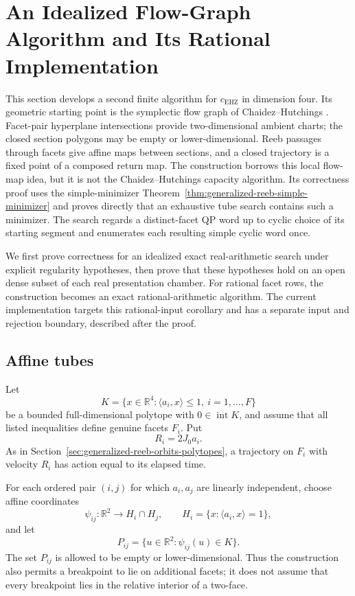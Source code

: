 \section{An Idealized Flow-Graph Algorithm and Its Rational Implementation}
\label{sec:flow-graph-algorithm-ch2021}

This section develops a second finite algorithm for
\(c_{\mathrm{EHZ}}\) in dimension four.  Its geometric starting point is the
symplectic flow graph of Chaidez--Hutchings \cite{CH2021}.  Facet-pair
hyperplane intersections provide two-dimensional ambient charts; the closed
section polygons may be empty or lower-dimensional.  Reeb passages through
facets give affine maps between sections, and a closed trajectory is a fixed
point of a composed return map.  The construction borrows this local flow-map
idea, but it is not the Chaidez--Hutchings capacity algorithm.  Its correctness
proof uses the simple-minimizer
Theorem~\ref{thm:generalized-reeb-simple-minimizer} and proves directly that an
exhaustive tube search contains such a minimizer.
The search regards a distinct-facet QP word up to cyclic choice of its starting
segment and enumerates each resulting simple cyclic word once.

We first prove correctness for an idealized exact real-arithmetic search under
explicit regularity hypotheses, then prove that these hypotheses hold on an
open dense subset of each real presentation chamber.  For rational facet rows,
the construction becomes an exact rational-arithmetic algorithm.  The current
implementation targets this rational-input corollary and has a separate input
and rejection boundary, described after the proof.

\subsection{Affine tubes}
\label{subsec:flow-graph-algorithm-ch2021-definition}

Let
\[
  K=\{x\in\mathbb R^4:\langle a_i,x\rangle\leq1,
  \ i=1,\ldots,F\}
\]
be a bounded full-dimensional polytope with \(0\in\operatorname{int}K\), and
assume that all listed inequalities define genuine facets \(F_i\).  Put
\[
  R_i=2J_0a_i .
\]
As in Section~\ref{sec:generalized-reeb-orbits-polytopes}, a trajectory on
\(F_i\) with velocity \(R_i\) has action equal to its elapsed time.

For each ordered pair \((i,j)\) for which \(a_i,a_j\) are linearly
independent, choose affine coordinates
\[
  \psi_{ij}:\mathbb R^2\longrightarrow
  H_i\cap H_j,
  \qquad H_i=\{x:\langle a_i,x\rangle=1\},
\]
and let
\[
  P_{ij}=\{u\in\mathbb R^2:\psi_{ij}(u)\in K\}.
\]
The set \(P_{ij}\) is allowed to be empty or lower-dimensional.  Thus the
construction also permits a breakpoint to lie on additional facets; it does
not assume that every breakpoint lies in the relative interior of a
two-face.

